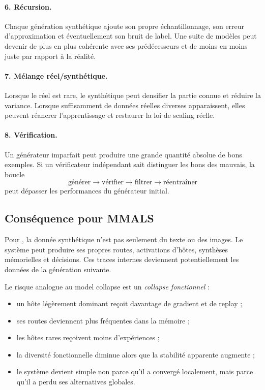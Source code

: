 \paragraph{6. Récursion.} Chaque génération synthétique ajoute son propre échantillonnage, son erreur d'approximation et éventuellement son bruit de label. Une suite de modèles peut devenir de plus en plus cohérente avec ses prédécesseurs et de moins en moins juste par rapport à la réalité.

\paragraph{7. Mélange réel/synthétique.} Lorsque le réel est rare, le synthétique peut densifier la partie connue et réduire la variance. Lorsque suffisamment de données réelles diverses apparaissent, elles peuvent réancrer l'apprentissage et restaurer la loi de scaling réelle.

\paragraph{8. Vérification.} Un générateur imparfait peut produire une grande quantité absolue de bons exemples. Si un vérificateur indépendant sait distinguer les bons des mauvais, la boucle
\[
\text{générer} \rightarrow \text{vérifier} \rightarrow \text{filtrer} \rightarrow \text{réentraîner}
\]
peut dépasser les performances du générateur initial.

\subsection{Conséquence pour MMALS}

Pour \MMALS, la donnée synthétique n'est pas seulement du texte ou des images. Le système peut produire ses propres routes, activations d'hôtes, synthèses mémorielles et décisions. Ces traces internes deviennent potentiellement les données de la génération suivante.

Le risque analogue au model collapse est un \emph{collapse fonctionnel} :

\begin{itemize}[leftmargin=*]
  \item un hôte légèrement dominant reçoit davantage de gradient et de replay ;
  \item ses routes deviennent plus fréquentes dans la mémoire ;
  \item les hôtes rares reçoivent moins d'expériences ;
  \item la diversité fonctionnelle diminue alors que la stabilité apparente augmente ;
  \item le système devient simple non parce qu'il a convergé localement, mais parce qu'il a perdu ses alternatives globales.
\end{itemize}

